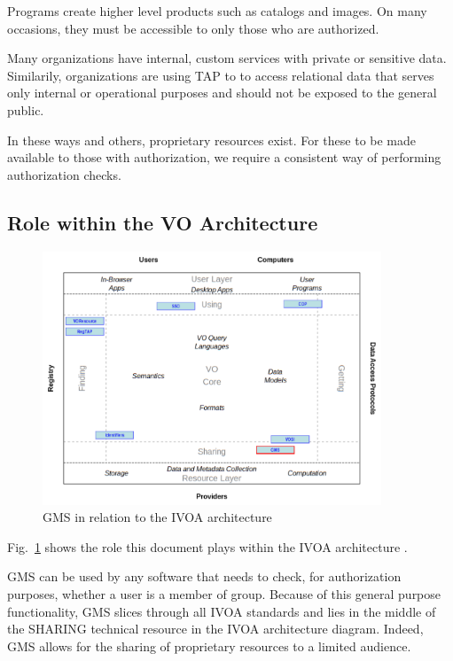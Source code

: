 \documentclass[11pt,a4paper]{ivoa}
\begin{document}
Programs create higher level products such as catalogs and images.  On many occasions, they must be accessible to only those who are authorized.

Many organizations have internal, custom services with private or sensitive data.  Similarily, organizations are using TAP to to access relational data that serves only internal or operational purposes and should not be exposed to the general public.

In these ways and others, proprietary resources exist.  For these to be made available to those with authorization, we require a consistent way of performing authorization checks.

\subsection{Role within the VO Architecture}

\begin{figure}
\centering

\includegraphics[width=0.9\textwidth]{role_diagram.pdf}
\caption{GMS in relation to the IVOA architecture}
\label{fig:archdiag}
\end{figure}

Fig.~\ref{fig:archdiag} shows the role this document plays within the
IVOA architecture \citep{note:VOARCH}.

GMS can be used by any software that needs to check, for authorization purposes, whether a user is a member of group.  Because of this general purpose functionality, GMS slices through all IVOA standards and lies in the middle of the SHARING technical resource in the IVOA architecture diagram.  Indeed, GMS allows for the sharing of proprietary resources to a limited audience.
\end{document}
